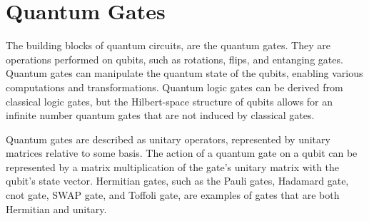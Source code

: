 \documentclass[inscr,ack,preface]{diphdthesis}
\begin{document}
\section{Quantum Gates}

The building blocks of quantum circuits, are the quantum gates. They are operations performed on \acrshort{qubit}s, such as rotations, flips, and entanging gates. Quantum gates can manipulate the quantum state of the \acrshort{qubit}s, enabling various computations and transformations. Quantum logic gates can be derived from classical logic gates, but the Hilbert-space structure of \acrshort{qubit}s allows for an infinite number quantum gates that are not induced by classical gates.

Quantum gates are described as unitary operators, represented by unitary matrices relative to some basis. The action of a quantum gate on a \acrshort{qubit} can be represented by a matrix multiplication of the gate's unitary matrix with the \acrshort{qubit}'s state vector. Hermitian gates, such as the Pauli gates, Hadamard gate, \acrshort{cnot} gate, SWAP gate, and Toffoli gate, are examples of gates that are both Hermitian and unitary.
\end{document}
